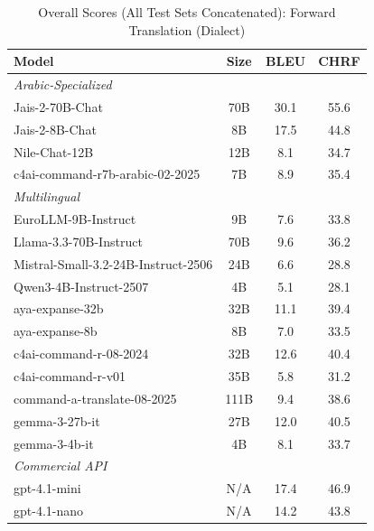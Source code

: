 \begin{table}[htbp]
\centering
\caption{Overall Scores (All Test Sets Concatenated): Forward Translation (Dialect)}
\label{tab:overall_scores_forward_dialect}
\begin{tabular}{l@{\hspace{3pt}}c@{\hspace{3pt}}c@{\hspace{3pt}}c}
\toprule
Model & Size & BLEU & CHRF \\
\midrule
\multicolumn{4}{l}{\textit{Arabic-Specialized}} \\
\midrule
Jais-2-70B-Chat & 70B & 30.1 & 55.6 \\
Jais-2-8B-Chat & 8B & 17.5 & 44.8 \\
Nile-Chat-12B & 12B & 8.1 & 34.7 \\
c4ai-command-r7b-arabic-02-2025 & 7B & 8.9 & 35.4 \\
\midrule
\multicolumn{4}{l}{\textit{Multilingual}} \\
\midrule
EuroLLM-9B-Instruct & 9B & 7.6 & 33.8 \\
Llama-3.3-70B-Instruct & 70B & 9.6 & 36.2 \\
Mistral-Small-3.2-24B-Instruct-2506 & 24B & 6.6 & 28.8 \\
Qwen3-4B-Instruct-2507 & 4B & 5.1 & 28.1 \\
aya-expanse-32b & 32B & 11.1 & 39.4 \\
aya-expanse-8b & 8B & 7.0 & 33.5 \\
c4ai-command-r-08-2024 & 32B & 12.6 & 40.4 \\
c4ai-command-r-v01 & 35B & 5.8 & 31.2 \\
command-a-translate-08-2025 & 111B & 9.4 & 38.6 \\
gemma-3-27b-it & 27B & 12.0 & 40.5 \\
gemma-3-4b-it & 4B & 8.1 & 33.7 \\
\midrule
\multicolumn{4}{l}{\textit{Commercial API}} \\
\midrule
gpt-4.1-mini & N/A & 17.4 & 46.9 \\
gpt-4.1-nano & N/A & 14.2 & 43.8 \\
\midrule
\bottomrule
\end{tabular}
\end{table}